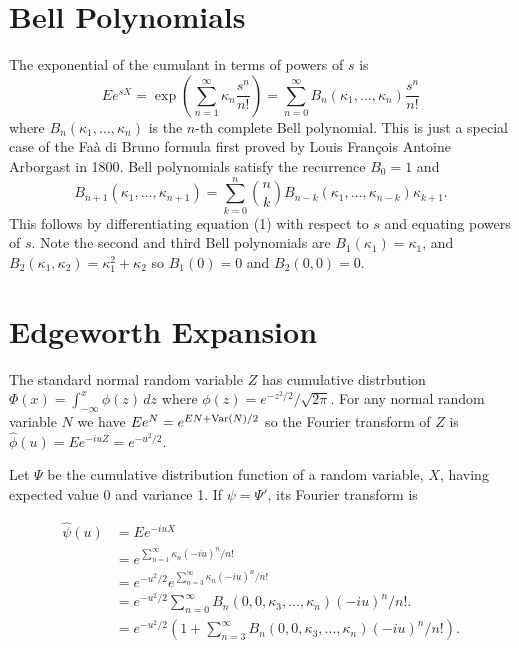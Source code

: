 \documentclass[fleqn]{amsart}
\newcommand{\Var}{\mathop{\rm{Var}}}
\theoremstyle{definition}
\begin{document}
\section{Bell Polynomials}

The exponential of the cumulant in terms of
powers of \(s\) is
\begin{equation}
Ee^{sX} =  \exp(\sum_{n=1}^\infty \kappa_n \frac{s^n}{n!})
= \sum_{n=0}^\infty B_n(\kappa_1,\dots,\kappa_n) \frac{s^n}{n!}
\end{equation}\label{eq:1}
where \(B_n(\kappa_1,\dots,\kappa_n)\) is the \(n\)-th complete
Bell polynomial.
This is just a special case of the
Fa\`a di Bruno formula first proved by Louis Fran\c{c}ois Antoine
Arborgast in 1800\cite{Arb1800}.
Bell polynomials satisfy the recurrence \cite{Com1974} \(B_0 = 1\) and
\[
B_{n+1}(\kappa_1,\dots,\kappa_{n+1}) = \sum_{k=0}^n \binom{n}{k}
B_{n - k}(\kappa_1,\dots, \kappa_{n - k}) \kappa_{k+1}.
\]
This follows by differentiating equation (1) with respect to \(s\) and equating powers of \(s\).
Note the second and third Bell polynomials are \(B_1(\kappa_1) = \kappa_1\), and
\(B_2(\kappa_1, \kappa_2) = \kappa_1^2 + \kappa_2\) so \(B_1(0) = 0\) and \(B_2(0,0) = 0\).

\section{Edgeworth Expansion}
The standard normal random variable \(Z\) has cumulative distrbution \(\Phi(x) = \int_{-\infty}^x \phi(z)\,dz\) where \(\phi(z) =e^{-z^2/2}/\sqrt{2\pi}\). 
For any normal random variable \(N\) we have \(Ee^N = e^{EN + \Var(N)/2}\)
so the Fourier transform of \(Z\) is \(\hat{\phi}(u) = Ee^{-iuZ} = e^{-u^2/2}\).

Let $\Psi$ be the cumulative distribution function of a random variable, $X$,
having expected value 0 and variance 1.
If \(\psi = \Psi'\), its Fourier transform is

\begin{align*}
\hat{\psi}(u) &= E e^{-iuX} \\
     &= e^{\sum_{n=1}^\infty \kappa_n (-iu)^n/n!}\\
     &= e^{-u^2/2} e^{\sum_{n=3}^\infty \kappa_n (-iu)^n/n!}\\
     &= e^{-u^2/2} \sum_{n=0}^\infty B_n(0, 0, \kappa_3,...,\kappa_n)(-iu)^n/n!.\\
	  &= e^{-u^2/2} (1 + \sum_{n=3}^\infty B_n(0, 0, \kappa_3,...,\kappa_n)(-iu)^n/n!).\\
\end{align*}
\end{document}
